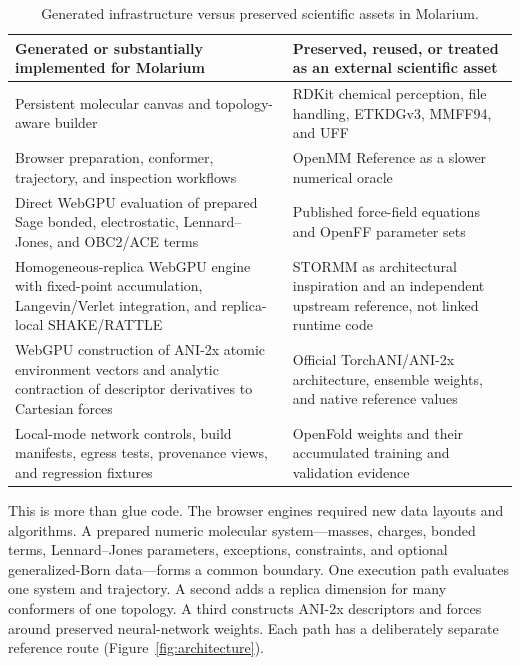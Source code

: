 \documentclass[11pt]{article}
\begin{document}
\begin{table}[htbp]
\centering
\caption{Generated infrastructure versus preserved scientific assets in Molarium.}
\label{tab:generated-preserved}
\footnotesize
\begin{tabularx}{\linewidth}{@{}>{\raggedright\arraybackslash}X >{\raggedright\arraybackslash}X@{}}
\toprule
\textbf{Generated or substantially implemented for Molarium} & \textbf{Preserved, reused, or treated as an external scientific asset} \\
\midrule
Persistent molecular canvas and topology-aware builder & RDKit chemical perception, file handling, ETKDGv3, MMFF94, and UFF \\
Browser preparation, conformer, trajectory, and inspection workflows & OpenMM Reference as a slower numerical oracle \\
Direct WebGPU evaluation of prepared Sage bonded, electrostatic, Lennard--Jones, and OBC2/ACE terms & Published force-field equations and OpenFF parameter sets \\
Homogeneous-replica WebGPU engine with fixed-point accumulation, Langevin/Verlet integration, and replica-local SHAKE/RATTLE & STORMM as architectural inspiration and an independent upstream reference, not linked runtime code~\cite{cerutti2024stormm} \\
WebGPU construction of ANI-2x atomic environment vectors and analytic contraction of descriptor derivatives to Cartesian forces & Official TorchANI/ANI-2x architecture, ensemble weights, and native reference values~\cite{gao2020torchani,devereux2020ani2x} \\
Local-mode network controls, build manifests, egress tests, provenance views, and regression fixtures & OpenFold weights and their accumulated training and validation evidence~\cite{ahdritz2024openfold} \\
\bottomrule
\end{tabularx}
\end{table}

This is more than glue code.
The browser engines required new data layouts and algorithms.
A prepared numeric molecular system---masses, charges, bonded terms, Lennard--Jones parameters, exceptions, constraints, and optional generalized-Born data---forms a common boundary.
One execution path evaluates one system and trajectory.
A second adds a replica dimension for many conformers of one topology.
A third constructs ANI-2x descriptors and forces around preserved neural-network weights.
Each path has a deliberately separate reference route (Figure~\ref{fig:architecture}).
\end{document}
